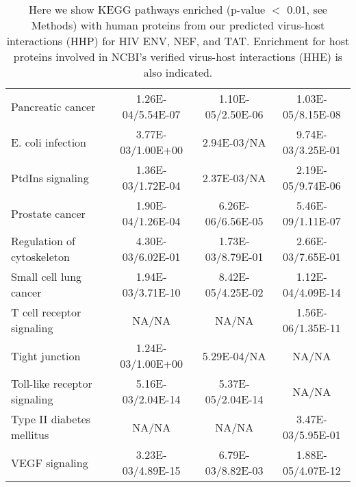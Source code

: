 \begin{table}
\begin{center}
\begin{tabular}{|l|c|c|c|}
Pancreatic cancer & 1.26E-04/5.54E-07 & 1.10E-05/2.50E-06 & 1.03E-05/8.15E-08 \\
E. coli infection & 3.77E-03/1.00E+00 & 2.94E-03/NA & 9.74E-03/3.25E-01 \\
PtdIns signaling & 1.36E-03/1.72E-04 & 2.37E-03/NA & 2.19E-05/9.74E-06 \\
Prostate cancer & 1.90E-04/1.26E-04 & 6.26E-06/6.56E-05 & 5.46E-09/1.11E-07 \\
Regulation of cytoskeleton & 4.30E-03/6.02E-01 & 1.73E-03/8.79E-01 & 2.66E-03/7.65E-01 \\
Small cell lung cancer & 1.94E-03/3.71E-10 & 8.42E-05/4.25E-02 & 1.12E-04/4.09E-14 \\
T cell receptor signaling & NA/NA & NA/NA & 1.56E-06/1.35E-11 \\
Tight junction & 1.24E-03/1.00E+00 & 5.29E-04/NA & NA/NA \\
Toll-like receptor signaling & 5.16E-03/2.04E-14 & 5.37E-05/2.04E-14 & NA/NA \\
Type II diabetes mellitus & NA/NA & NA/NA & 3.47E-03/5.95E-01 \\
VEGF signaling & 3.23E-03/4.89E-15 & 6.79E-03/8.82E-03 & 1.88E-05/4.07E-12 \\
\hline
  \end{tabular}
\end{center}
\caption[KEGG pathway enrichment for predicted and experimentally
  verified HIV targeted human proteins]{\small Here we show KEGG
  pathways enriched (p-value $<$ 0.01, see Methods) with human proteins
  from our predicted virus-host interactions (HHP) for HIV ENV, NEF,
  and TAT. Enrichment for host proteins involved in NCBI's verified
  virus-host interactions (HHE) is also
  indicated. \label{tbl:medGen1:KEGG}}
\end{table}

